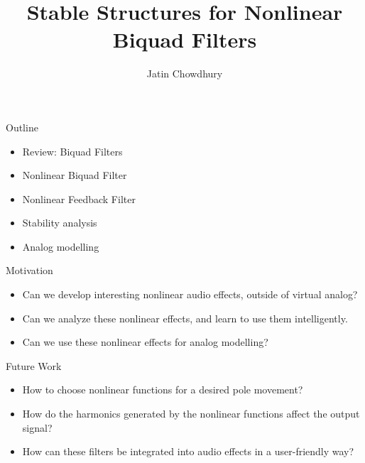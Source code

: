 \documentclass[14pt,aspectratio=169]{beamer}
\title{Stable Structures for Nonlinear Biquad Filters}
\author{Jatin Chowdhury}
\institute[shortinst]{Center for Computer Research in Music and Acoustics (CCRMA)}
\begin{document}
{
  \begin{frame}
    \titlepage
  \end{frame}
}

\begin{frame}{Outline}
    \begin{itemize}
        \setlength\itemsep{0.8em}
        \item Review: Biquad Filters
        \item Nonlinear Biquad Filter
        \item Nonlinear Feedback Filter
        \item Stability analysis
        \item Analog modelling
    \end{itemize}
\end{frame}

\begin{frame}{Motivation}
    \begin{itemize}
        \item Can we develop interesting nonlinear audio effects, outside of virtual analog?
        \item Can we analyze these nonlinear effects, and learn to use them intelligently.
        \item Can we use these nonlinear effects for analog modelling?
    \end{itemize}
\end{frame}



\begin{frame}{Future Work}
    \begin{itemize}
        \setlength\itemsep{0.8em}
        \item How to choose nonlinear functions for a desired pole movement?
        \item How do the harmonics generated by the nonlinear functions affect the output signal?
        \item How can these filters be integrated into audio effects in a user-friendly way?
    \end{itemize}
\end{frame}
\end{document}
